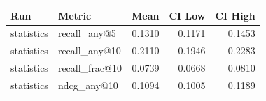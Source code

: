 \begin{tabular}{llrrr}
\toprule
Run & Metric & Mean & CI Low & CI High \\
\midrule
statistics & recall\_any@5 & 0.1310 & 0.1171 & 0.1453 \\
statistics & recall\_any@10 & 0.2110 & 0.1946 & 0.2283 \\
statistics & recall\_frac@10 & 0.0739 & 0.0668 & 0.0810 \\
statistics & ndcg\_any@10 & 0.1094 & 0.1005 & 0.1189 \\
\bottomrule
\end{tabular}
